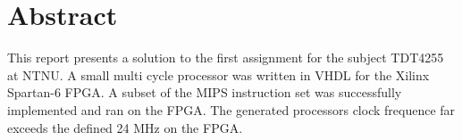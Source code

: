 \section*{Abstract}
\label{sec:abstract}

\vspace*{\fill}
This report presents a solution to the first assignment for the subject TDT4255 at NTNU.
A small multi cycle processor was written in VHDL for the Xilinx Spartan-6 FPGA.
A subset of the MIPS instruction set was successfully implemented and ran on the FPGA.
The generated processors clock frequence far exceeds the defined 24 MHz on the FPGA.
\vspace*{\fill}
